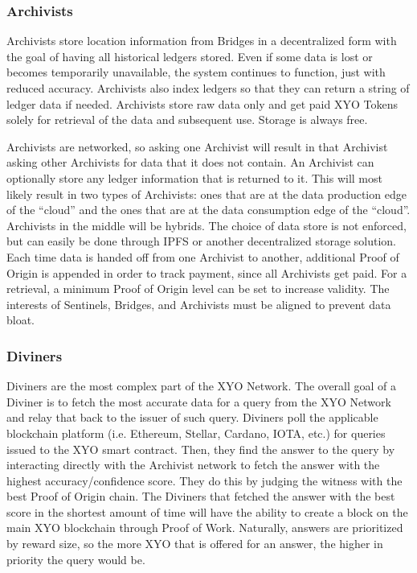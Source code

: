 \documentclass{article}
\begin{document}
\subsubsection{Archivists}

Archivists store location information from Bridges in a decentralized form with the goal of having all historical ledgers stored. Even if some data is lost or becomes temporarily unavailable, the system continues to function, just with reduced accuracy. Archivists also index ledgers so that they can return a string of ledger data if needed. Archivists store raw data only and get paid XYO Tokens solely for retrieval of the data and subsequent use. Storage is always free.

Archivists are networked, so asking one Archivist will result in that Archivist asking other Archivists for data that it does not contain. An Archivist can optionally store any ledger information that is returned to it. This will most likely result in two types of Archivists: ones that are at the data production edge of the ``cloud'' and the ones that are at the data consumption edge of the ``cloud''. Archivists in the middle will be hybrids. The choice of data store is not enforced, but can easily be done through IPFS or another decentralized storage solution. Each time data is handed off from one Archivist to another, additional Proof of Origin is appended in order to track payment, since all Archivists get paid. For a retrieval, a minimum Proof of Origin level can be set to increase validity. The interests of Sentinels, Bridges, and Archivists must be aligned to prevent data bloat.

\subsubsection{Diviners}

Diviners are the most complex part of the XYO Network. The overall goal of a Diviner is to fetch the most accurate data for a query from the XYO Network and relay that back to the issuer of such query. Diviners poll the applicable blockchain platform (i.e. Ethereum, Stellar, Cardano, IOTA, etc.) for queries issued to the XYO smart contract. Then, they find the answer to the query by interacting directly with the Archivist network to fetch the answer with the highest accuracy/confidence score. They do this by judging the witness with the best Proof of Origin chain. The Diviners that fetched the answer with the best score in the shortest amount of time will have the ability to create a block on the main XYO blockchain through Proof of Work. Naturally, answers are prioritized by reward size, so the more XYO that is offered for an answer, the higher in priority the query would be.
\end{document}
